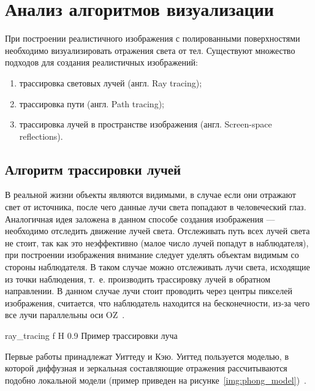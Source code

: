 \section{Анализ алгоритмов визуализации}




При построении реалистичного изображения с полированными поверхностями необходимо визуализировать отражения света от тел.
Существуют множество подходов для создания реалистичных изображений:
\begin{enumerate}
	\item трассировка световых лучей (англ. Ray tracing);
	\item трассировка пути (англ. Path  tracing);
	\item трассировка лучей в пространстве изображения (англ. Screen-space reflections).
\end{enumerate}





\subsection{Алгоритм трассировки лучей}
\label{sec:ray_tracing}
В реальной жизни объекты являются видимыми, в случае если они отражают свет от источника, после чего данные лучи света попадают в человеческий глаз. Аналогичная идея заложена в данном способе создания изображения --- необходимо отследить движение лучей света.
Отслеживать путь всех лучей света не стоит, так как это неэффективно (малое число лучей попадут в наблюдателя), при построении изображения внимание следует уделять объектам видимым со стороны наблюдателя.
В таком случае можно отслеживать лучи света, исходящие из точки наблюдения, т.~е. производить трассировку лучей в обратном направлении. В данном случае лучи стоит проводить через центры пикселей изображения,
считается, что наблюдатель находится на бесконечности, из-за чего все лучи параллельны оси OZ~\cite{Rodgers,modern_ray_tracing}.




{ray_tracing} %
{f} %
{H} %
{0.9\textwidth} %
{Пример трассировки луча} %






Первые работы принадлежат Уиттеду и Кэю.
Уиттед пользуется моделью, в которой диффузная и зеркальная составляющие отражения рассчитываются подобно локальной модели (пример приведен на рисунке~\ref{img:phong_model})~\cite{Rodgers}.



